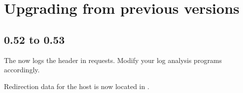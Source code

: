 
\chapter{Upgrading from previous versions}

\section{0.52 to 0.53}
The  now logs the  header in requests.  Modify
your log analysis programs accordingly.

Redirection data for the host  is now located in
.


